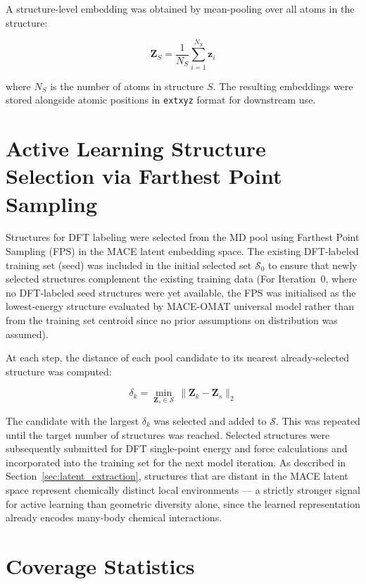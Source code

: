 \documentclass[12pt,a4paper,oneside]{book}
\begin{document}
A structure-level embedding was obtained by mean-pooling over all atoms in
the structure:

\begin{equation}
    \mathbf{Z}_S = \frac{1}{N_S} \sum_{i=1}^{N_S} \mathbf{z}_i
\end{equation}

where $N_S$ is the number of atoms in structure $S$.
The resulting embeddings were stored alongside atomic positions in
\texttt{extxyz} format for downstream use.

\section{Active Learning Structure Selection via Farthest Point Sampling}
\label{sec:fps_method}

Structures for DFT labeling were selected from the MD pool using Farthest
Point Sampling (FPS) in the MACE latent embedding space. The existing
DFT-labeled training set (seed) was included in the initial selected set
$\mathcal{S}_0$ to ensure that newly selected structures complement the
existing training data (For Iteration~0, where no DFT-labeled seed structures were yet available, the
FPS was initialised as the lowest-energy structure evaluated by MACE-OMAT universal model rather than from the
training set centroid since no prior assumptions on distribution was assumed).

At each step, the distance of each pool candidate to its nearest
already-selected structure was computed:

\begin{equation}
    \delta_k = \min_{\mathbf{Z}_s \in \mathcal{S}}\,
    \|\mathbf{Z}_k - \mathbf{Z}_s\|_2
\end{equation}

The candidate with the largest $\delta_k$ was selected and added to
$\mathcal{S}$. This was repeated until the target number of structures was
reached. Selected structures were subsequently submitted for DFT single-point
energy and force calculations and incorporated into the training set for the
next model iteration. As described in Section~\ref{sec:latent_extraction}, structures that are distant in the 
MACE latent space represent chemically distinct local environments --- a strictly 
stronger signal for active learning than geometric diversity alone, since the 
learned representation already encodes many-body chemical interactions.

\section{Coverage Statistics}
\label{sec:coverage_stats_methods}
\end{document}
